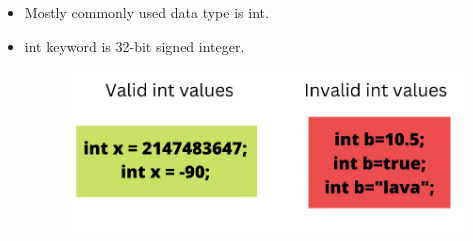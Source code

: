 

\begin{flushleft}
	
	\begin{itemize}
		\item Mostly commonly used data type is int.
		\item int keyword is 32-bit signed integer. 
		\bigskip
		
		\begin{figure}[h!]
			\centering
			\includegraphics[scale=.45]{content/chapter2/images/int.png}
		\end{figure}		
		
		
	\end{itemize}
	
\end{flushleft}

\newpage

